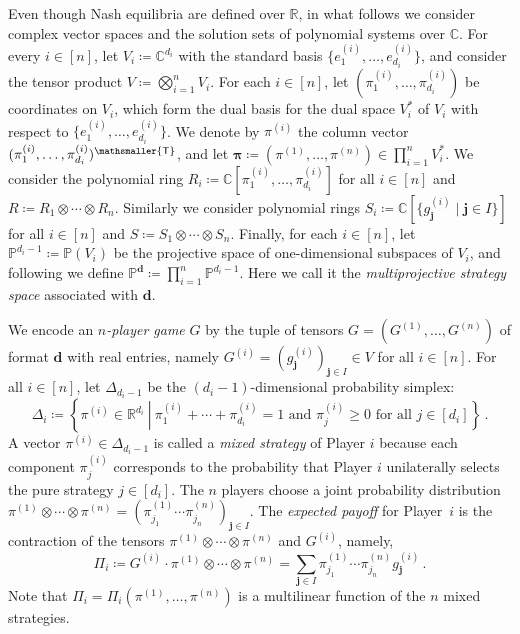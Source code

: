 \documentclass[12pt]{article}
\theoremstyle{definition}
\newcommand{\C}{{\mathbb C}}
\newcommand{\R}{{\mathbb R}}
\newcommand{\PP}{{\mathbb P}}
\def\bj{{\boldsymbol{j}}}
\def\bd{{\boldsymbol{d}}}
\def\bpi{{\boldsymbol{\pi}}}
\newcommand{\mT}{\mathsmaller{\mathsf{T}}}
\begin{document}
Even though Nash equilibria are defined over $\R$, in what follows we consider complex vector spaces and the solution sets of polynomial systems over $\C$. For every $i\in[n]$, let $V_i\coloneqq\C^{d_i}$ with the standard basis $\{e_1^{(i)},\ldots,e_{d_i}^{(i)}\}$, and consider the tensor product $V\coloneqq\bigotimes_{i=1}^n V_i$. For each $i \in [n]$, let  $(\pi_1^{(i)},\ldots, \pi_{d_i}^{(i)})$ be coordinates on $V_i$, which form the dual basis for the dual space $V_i^*$ of $V_i$ with respect to $\{e_1^{(i)},\ldots,e_{d_i}^{(i)}\}$. We denote by $\pi^{(i)}$ the column vector $(\pi_1^{(i)},\ldots, \pi_{d_i}^{(i)})^\mT$, and let $\bpi\coloneqq(\pi^{(1)},\ldots,\pi^{(n)})\in \prod_{i=1}^n V_i^*$.
We consider the polynomial ring $R_i\coloneqq\C[\pi_1^{(i)},\ldots, \pi_{d_i}^{(i)}]$ for all $i\in[n]$ and $R\coloneqq R_1\otimes\cdots\otimes R_n$. Similarly we consider polynomial rings $S_i\coloneqq\C[\{g_\bj^{(i)} \mid \bj\in I\}]$ for all $i\in[n]$ and $S\coloneqq S_1\otimes\cdots\otimes S_n$.
Finally, for each $i \in [n]$, let $\PP^{d_i-1}\coloneqq \PP(V_i)$ be the projective space of one-dimensional subspaces of $V_i$, and following \cite{abo2026vector} we define $\PP^\bd\coloneqq\prod_{i=1}^n\PP^{d_i-1}$. Here we call it the {\em multiprojective strategy space} associated with $\bd$.

\bigskip

We encode an {\em $n$-player game} $G$ by the tuple of tensors $G=(G^{(1)},\ldots,G^{(n)})$ of format $\bd$ with real entries, namely $G^{(i)}=(g_\bj^{(i)})_{\bj\in I}\in V$ for all $i\in[n]$.
For all $i\in[n]$, let $\Delta_{d_i-1}$ be the $(d_i-1)$-dimensional probability simplex:
\[
    \Delta_i \coloneqq \left\{\pi^{(i)}\in \R^{d_i}\ \left|\ \text{$\pi_1^{(i)}+\cdots+\pi_{d_i}^{(i)}=1$ and $\pi_{j}^{(i)} \ge 0$ for all $j\in[d_i]$}\right.\right\}\,.
\]
A vector $\pi^{(i)}\in \Delta_{d_i-1}$ is called a {\em mixed strategy} of Player $i$ because each component $\pi_{j}^{(i)}$ corresponds to the probability that Player $i$ unilaterally selects the pure strategy $j \in [d_i]$. The $n$ players choose a joint probability distribution $\pi^{(1)}\otimes\cdots\otimes\pi^{(n)}=(\pi_{j_1}^{(1)}\cdots\pi_{j_n}^{(n)})_{\bj\in I}$. The {\em expected payoff} for Player~$i$ is the contraction of the tensors $\pi^{(1)}\otimes\cdots\otimes\pi^{(n)}$ and $G^{(i)}$, namely, 
\begin{equation}\label{eq: expected payoff}
\Pi_i\coloneqq G^{(i)}\cdot\pi^{(1)}\otimes\cdots\otimes\pi^{(n)} = \sum_{\bj\in I}\pi_{j_1}^{(1)}\cdots\pi_{j_n}^{(n)}g_{\bj}^{(i)}\,.
\end{equation}
Note that $\Pi_i=\Pi_i(\pi^{(1)},\ldots,\pi^{(n)})$ is a multilinear function of the $n$ mixed strategies.
\end{document}
